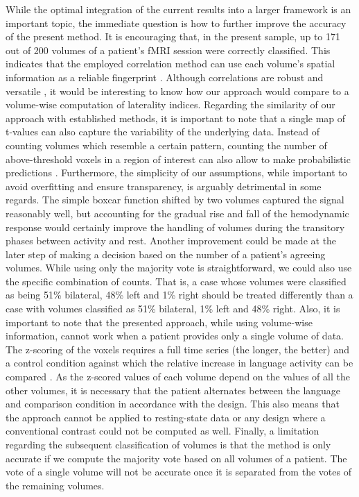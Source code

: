 \documentclass[fleqn,10pt]{SelfArx} %
\begin{document}
While the optimal integration of the current results into a larger framework is an important topic, the immediate question is how to further improve the accuracy of the present method. It is encouraging that, in the present sample, up to 171 out of 200 volumes of a patient’s fMRI session were correctly classified. This indicates that the employed correlation method can use each volume’s spatial information as a reliable fingerprint \citep{Chang_2015, Woo_2017}. Although correlations are robust and versatile \citep{Hilborn_1997, Haxby_2001}, it would be interesting to know how our approach would compare to a volume-wise computation of laterality indices. Regarding the similarity of our approach with established methods, it is important to note that a single map of t-values can also capture the variability of the underlying data. Instead of counting volumes which resemble a certain pattern, counting the number of above-threshold voxels in a region of interest can also allow to make probabilistic predictions \citep{Wegrzyn_2019}. Furthermore, the simplicity of our assumptions, while important to avoid overfitting and ensure transparency, is arguably detrimental in some regards. The simple boxcar function shifted by two volumes captured the signal reasonably well, but accounting for the gradual rise and fall of the hemodynamic response would certainly improve the handling of volumes during the transitory phases between activity and rest. Another improvement could be made at the later step of making a decision based on the number of a patient’s agreeing volumes. While using only the majority vote is straightforward, we could also use the specific combination of counts. That is, a case whose volumes were classified as being 51\% bilateral, 48\% left and 1\% right should be treated differently than a case with volumes classified as 51\% bilateral, 1\% left and 48\% right. Also, it is important to note that the presented approach, while using volume-wise information, cannot work when a patient provides only a single volume of data. The z-scoring of the voxels requires a full time series (the longer, the better) and a control condition against which the relative increase in language activity can be compared \citep{Wegrzyn_2018}. As the z-scored values of each volume depend on the values of all the other volumes, it is necessary that the patient alternates between the language and comparison condition in accordance with the design. This also means that the approach cannot be applied to resting-state data or any design where a conventional contrast could not be computed as well. Finally, a limitation regarding the subsequent classification of volumes is that the method is only accurate if we compute the majority vote based on all volumes of a patient. The vote of a single volume will not be accurate once it is separated from the votes of the remaining volumes.
\end{document}
